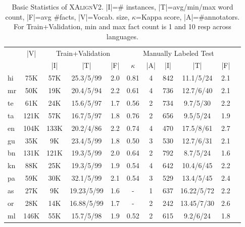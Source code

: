 \documentclass[runningheads]{llncs}
\newcommand{\data}{\textsc{XAlignV2}}
\begin{document}
\begin{table}[!t]
    \centering
    \scriptsize
    \begin{tabular}{|l|c|c|c|c|c|c|c|c|c|c|}
    \hline
    &\multirow{2}{*}{|V|}&\multicolumn{3}{c|}{Train+Validation}&\multicolumn{5}{c|}{Manually Labeled Test}\\
    \cline{3-10}
& &|I|&|T|& |F|& $\kappa$&|A| &|I|&|T|&|F|\\
    \hline
    \hline
    hi&75K&57K&25.3/5/99&2.0&0.81&4&842&11.1/5/24&2.1\\
    \hline
    mr&50K&19K&20.4/5/94&2.2&0.61&4&736&12.7/6/40&2.1\\
    \hline
    te&61K&24K&15.6/5/97&1.7&0.56&2&734&9.7/5/30&2.2\\
    \hline
    ta&121K&57K&16.7/5/97&1.8&0.76&2&656&9.5/5/24&1.9\\
    \hline
    en&104K&133K&20.2/4/86&2.2&0.74&4&470&17.5/8/61&2.7\\
    \hline
    gu&35K&9K&23.4/5/99&1.8&0.50&3&530&12.7/6/31&2.1\\
    \hline
    bn&131K&121K&19.3/5/99&2.0&0.64&2&792&8.7/5/24&1.6\\
    \hline
    kn&88K&25K&19.3/5/99&1.9&0.54&4&642&10.4/6/45&2.2\\
    \hline
    pa&59K&30K&32.1/5/99&2.1&0.54&3&529&13.4/5/45&2.4\\
    \hline
    as&27K&9K&19.23/5/99&1.6&-&1&637&16.22/5/72&2.2\\
    \hline
    or&28K&14K&16.88/5/99&1.7&-&2&242&13.45/7/30&2.6\\
    \hline
    ml&146K&55K&15.7/5/98&1.9&0.52&2&615&9.2/6/24&1.8\\
    \hline
\end{tabular}
    \caption{Basic Statistics of \data{}. |I|=\# instances, |T|=avg/min/max word count, |F|=avg \#facts, |V|=Vocab. size, $\kappa$=Kappa score, |A|=\#annotators. For Train+Validation, min and max fact count is 1 and 10 resp across languages.\protect\footnotemark}
    \label{tab:xalignDataStats}
\end{table}

\end{document}
